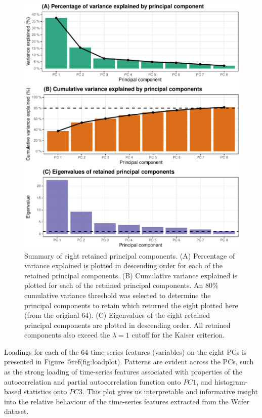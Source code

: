 \documentclass{article}
\begin{document}
\begin{figure}
\centering
\includegraphics{olet5610_report_files/figure-latex/eigenplots-1.pdf}
\caption{Summary of eight retained principal components. (A) Percentage
of variance explained is plotted in descending order for each of the
retained principal components. (B) Cumulative variance explained is
plotted for each of the retained principal components. An 80\%
cumulative variance threshold was selected to determine the principal
components to retain which returned the eight plotted here (from the
original 64). (C) Eigenvalues of the eight retained principal components
are plotted in descending order. All retained components also exceed the
\(\lambda = 1\) cutoff for the Kaiser criterion.}
\end{figure}

Loadings for each of the 64 time-series features (variables) on the
eight PCs is presented in Figure @ref(fig:loadplot). Patterns are
evident across the PCs, such as the strong loading of time-series
features associated with properties of the autocorrelation and partial
autocorrelation function onto \(PC 1\), and histogram-based statistics
onto \(PC 3\). This plot gives us interpretable and informative insight
into the relative behaviour of the time-series features extracted from
the Wafer dataset.
\end{document}
